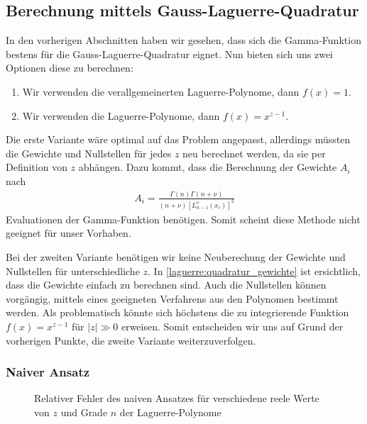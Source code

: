 \subsection{Berechnung mittels Gauss-Laguerre-Quadratur}
In den vorherigen Abschnitten haben wir gesehen,
dass sich die Gamma-Funktion bestens für die Gauss-Laguerre-Quadratur eignet.
Nun bieten sich uns zwei Optionen diese zu berechnen:
\begin{enumerate}
\item Wir verwenden die verallgemeinerten Laguerre-Polynome, dann $f(x)=1$.
\item Wir verwenden die Laguerre-Polynome, dann $f(x)=x^{z-1}$.
\end{enumerate}
Die erste Variante wäre optimal auf das Problem angepasst,
allerdings müssten die Gewichte und Nullstellen für jedes $z$
neu berechnet werden,
da sie per Definition von $z$ abhängen.
Dazu kommt,
dass die Berechnung der Gewichte $A_i$ nach \cite{Cassity1965AbcissasCA}
\begin{align*}
A_i
=
\frac{
\Gamma(n) \Gamma(n+\nu)
}
{
(n+\nu)
\left[L_{n-1}^{\nu}(x_i)\right]^2
}
\end{align*}
Evaluationen der Gamma-Funktion benötigen.
Somit scheint diese Methode nicht geeignet für unser Vorhaben.

Bei der zweiten Variante benötigen wir keine Neuberechung der Gewichte
und Nullstellen für unterschiedliche $z$.
In \eqref{laguerre:quadratur_gewichte} ist ersichtlich,
dass die Gewichte einfach zu berechnen sind.
Auch die Nullstellen können vorgängig,
mittels eines geeigneten Verfahrens aus den Polynomen bestimmt werden.
Als problematisch könnte sich höchstens
die zu integrierende Funktion $f(x)=x^{z-1}$ für $|z| \gg 0$ erweisen.
Somit entscheiden wir uns auf Grund der vorherigen Punkte,
die zweite Variante weiterzuverfolgen.

\subsubsection{Naiver Ansatz}

\begin{figure}
\centering

\caption{Relativer Fehler des naiven Ansatzes
für verschiedene reele Werte von $z$ und Grade $n$ der Laguerre-Polynome}
\label{laguerre:fig:rel_error_simple}
\end{figure}

